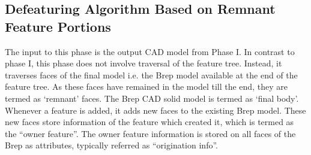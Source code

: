 \subsection{Defeaturing Algorithm Based on Remnant Feature Portions}


The input to this phase is the output CAD model from Phase I. In contrast to phase I, this phase does not involve traversal of the feature tree. Instead, it traverses faces of the final model i.e. the Brep model available at the end of the feature tree. As these faces have remained in the model till the end, they are termed as `remnant' faces. The Brep CAD solid model is termed as `final body'. Whenever a feature is added, it adds new faces to the existing Brep model. These new faces store information of the feature which created it, which is termed as the ``owner feature''. The owner feature information is stored on all faces of the Brep as attributes, typically referred as ``origination info''.

